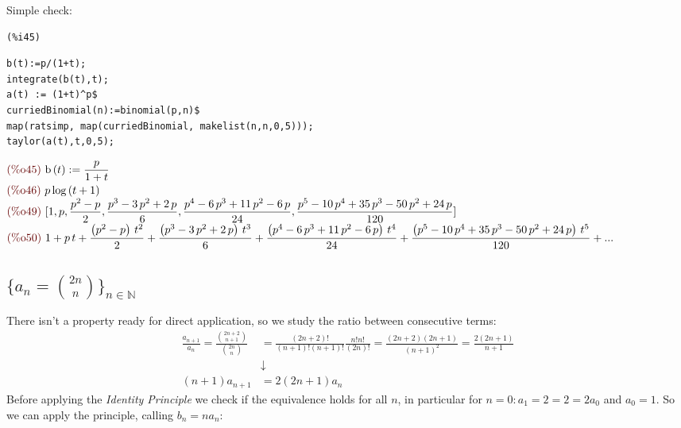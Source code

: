 Simple check:


\noindent
\begin{minipage}[t]{8ex}{\color{red}\bf
\begin{verbatim}
(%i45) 
\end{verbatim}}
\end{minipage}
\begin{minipage}[t]{\textwidth}{\color{blue}
\begin{verbatim}
b(t):=p/(1+t);
integrate(b(t),t);
a(t) := (1+t)^p$
curriedBinomial(n):=binomial(p,n)$
map(ratsimp, map(curriedBinomial, makelist(n,n,0,5)));
taylor(a(t),t,0,5);
\end{verbatim}}
\end{minipage}
\begin{math}\displaystyle
\parbox{8ex}{\color{labelcolor}(\%o45) }
\mathrm{b}\left( t\right) :=\frac{p}{1+t}
\end{math}\\
\begin{math}\displaystyle
\parbox{8ex}{\color{labelcolor}(\%o46) }
p\,\mathrm{log}\left( t+1\right) 
\end{math}\\
\begin{math}\displaystyle
\parbox{8ex}{\color{labelcolor}(\%o49) }
[1,p,\frac{{p}^{2}-p}{2},\frac{{p}^{3}-3\,{p}^{2}+2\,p}{6},\frac{{p}^{4}-6\,{p}^{3}+11\,{p}^{2}-6\,p}{24},\\\frac{{p}^{5}-10\,{p}^{4}+35\,{p}^{3}-50\,{p}^{2}+24\,p}{120}]
\end{math}\\
\begin{math}\displaystyle
\parbox{8ex}{\color{labelcolor}(\%o50) }
1+p\,t+\frac{\left( {p}^{2}-p\right) \,{t}^{2}}{2}+\frac{\left(
    {p}^{3}-3\,{p}^{2}+2\,p\right) \,{t}^{3}}{6}+\frac{\left(
    {p}^{4}-6\,{p}^{3}+11\,{p}^{2}-6\,p\right)
  \,{t}^{4}}{24}+\frac{\left(
    {p}^{5}-10\,{p}^{4}+35\,{p}^{3}-50\,{p}^{2}+24\,p\right)
  \,{t}^{5}}{120}+...
\end{math}

\subsection{$\{a_n = {{2n}\choose{n}} \}_{n \in \mathbb{N} }$}

There isn't a property ready for direct application, so we study the
ratio between consecutive terms:
\begin{displaymath}
  \begin{split}
    \frac{a_{n+1}}{a_n} = \frac{{{2n+2}\choose{n+1}}
    }{{{2n}\choose{n}} } &= \frac{(2n+2)!}{(n + 1)!(n+1)!}
    \frac{n!n!}{(2n)!} =
    \frac{(2n+2)(2n+1)}{(n+1)^2} = \frac{2(2n+1)}{n+1}\\
    &\downarrow \\
    (n+1)a_{n+1} &= 2(2n+1)a_n
  \end{split}
\end{displaymath}
Before applying the \emph{Identity Principle} we check if the
equivalence holds for all $n$, in particular for $n=0: a_1 = 2 = 2 =
2a_0$ and $a_0=1$. So we can apply the principle, calling $b_n = n
a_n$:

